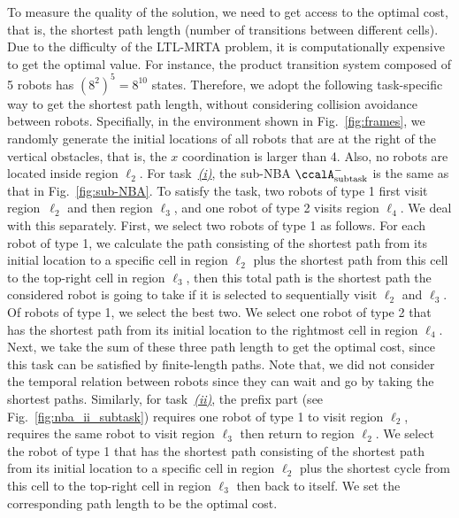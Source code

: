 \documentclass[Afour,sageh,times]{sagej}
\newcommand{\auto}[1]{\ccalA_{\textup{#1}}}
\begin{document}
{To measure the quality of the solution, we need to get access to the optimal cost, that is, the shortest path length (number of transitions between different cells). Due to the difficulty of the LTL-MRTA problem, it is computationally expensive to get the optimal value. For instance, the product transition system composed of 5 robots has $(8^2)^5=8^{10}$ states. Therefore, we adopt the following task-specific way to get the shortest path length, without considering collision avoidance between robots. Specifially, in the environment shown in Fig.~\ref{fig:frames},  we randomly generate the initial locations of all robots that are at the right of the vertical obstacles, that is, the $x$ coordination is larger than 4. Also, no robots are located inside region $\ell_2$. For task~\hyperref[task:i]{\it (i)}, the sub-NBA $\auto{subtask}^-$ is the same as that in Fig.~\ref{fig:sub-NBA}. To satisfy the task, two robots of type 1 first visit region~$\ell_2$ and then region $\ell_3$, and one robot of type 2 visits region $\ell_4$. We deal with this separately. First, we select two robots of type 1 as follows. For each robot of type 1, we calculate the path consisting of the shortest path from its initial location to a specific cell in region $\ell_2$ plus the shortest path from this cell to the  top-right cell in region $\ell_3$, then this total path is the shortest path the considered robot is going to  take if it is selected to sequentially visit $\ell_2$ and $\ell_3$. Of robots of type 1, we select the best two. We select one robot of type 2 that has the shortest path from its initial location to the  rightmost cell in region $\ell_4$. Next, we take the sum of these three path length to get the optimal cost, since this task can be satisfied by finite-length paths. Note that, we did not consider the temporal relation between robots since they can wait and go by taking the shortest paths. Similarly, for task~\hyperref[task:ii]{\it (ii)}, the prefix part (see Fig.~\ref{fig:nba_ii_subtask}) requires one robot of type 1 to visit region $\ell_2$,  requires the same robot to visit region $\ell_3$ then return to region $\ell_2$. We select the robot of type 1 that has the shortest path consisting of the shortest path from its initial location to a specific cell in region $\ell_2$ plus the shortest cycle from this cell to the top-right cell in region $\ell_3$ then back to itself. We set the corresponding path length to  be the optimal cost.

}
\end{document}
